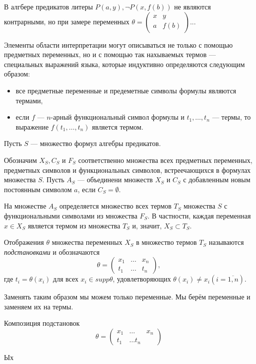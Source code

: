 \documentclass{article}
\begin{document}
В алгбере предикатов литеры $P(a, y), \neg P(x,f(b))$ не являются контрарными, но при замере переменных $\theta = \left(\begin{matrix}x & y \\ a & f(b)\end{matrix}\right)$...

Элементы области интерпретации могут описываться не только с помощью предметных переменных, но и с помощью так нахываемых термов --- специальных выражений языка, которые индуктивно определяются следующим образом:
\begin{itemize}
    \item все предметные переменные и предеметные символы формулы являются термами,
    \item если $f$ --- $n$-арный функциональный символ формулы и $t_1,\dots,t_n$ --- термы, то выражение $f(t_1,\dots,t_n)$ является термом.
\end{itemize}

Пусть $S$ --- множество формул алгебры предикатов.

Обозначим $X_S, C_S$ и $F_S$ соответственно множества всех предметных переменных, предметных символов и функциональных символов, встреечающихся в формулах множества $S$. Пусть $A_S$ --- объединени множеств $X_S$ и $C_S$ с добавленным новым постоянным символом $a$, если $C_S = \emptyset$.

На множестве $A_S$ определяется множество всех термов $T_S$ множества $S$ с функциональными символами из множества $F_S$. В частности, каждая переменная $x \in X_S$ является термом из множества $T_S$ и, значит, $X_S \subset T_S$.

Отображения $\theta$ множества переменных $X_S$ в множество термов $T_S$ называются {\it подстановками} и обозначаются
\begin{equation*}
    \theta = \left(\begin{matrix}
        x_1 & \dots & x_n \\ t_1 & \dots & t_n
    \end{matrix}\right),
\end{equation*}
где $t_i = \theta(x_i)$ для всех $x_i \in supp \theta$, удовлетворяющих $\theta(x_i) \neq x_i (i = \overline{1,n})$.

Заменять таким образом мы можем только переменные. Мы берём переменные и заменяем их на термы.

Композиция подстановок
\begin{equation*}
    \theta = \left(\begin{matrix}
        x_1 & \dots & x_n \\ t_1 & \dots t_n
    \end{matrix}\right)
\end{equation*}

Ых
\end{document}
